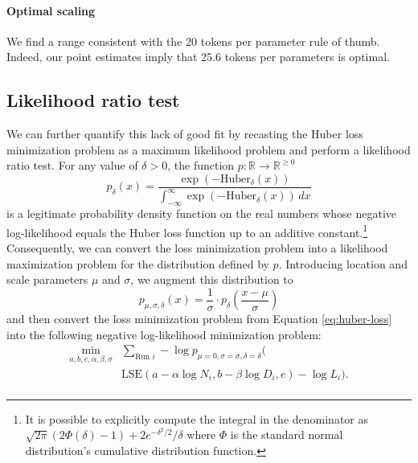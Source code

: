 \documentclass[twocolumn]{article}
\begin{document}
\paragraph{Optimal scaling} We find a range consistent with the 20 tokens per parameter rule of thumb. Indeed, our point estimates imply that 25.6 tokens per parameters is optimal.

\subsection{Likelihood ratio test}
\label{sec:likelihood_ratio}

We can further quantify this lack of good fit by recasting the Huber loss minimization problem as a maximum likelihood problem and perform a likelihood ratio test. For any value of \( \delta > 0 \), the function \( p: \mathbb R \to \mathbb R^{\geq 0} \)
\begin{equation}
    p_{\delta}(x) = \frac{\exp(-\text{Huber}_\delta(x))}{\int_{-\infty}^{\infty} \exp(-\text{Huber}_\delta(x)) \, dx}
\end{equation}
is a legitimate probability density function on the real numbers whose negative log-likelihood equals the Huber loss function up to an additive constant.\footnote{It is possible to explicitly compute the integral in the denominator as \( \sqrt{2 \pi} (2 \Phi(\delta) - 1) + 2 e^{-\delta^2/2}/\delta \) where $ \Phi $ is the standard normal distribution's cumulative distribution function.} Consequently, we can convert the loss minimization problem into a likelihood maximization problem for the distribution defined by \( p \). Introducing location and scale parameters \( \mu \) and \( \sigma \), we augment this distribution to
\begin{equation}
    p_{\mu, \sigma, \delta}(x) = \frac{1}{\sigma} \cdot p_{\delta} \left( \frac{x - \mu}{\sigma} \right)
\end{equation}
and then convert the loss minimization problem from Equation \ref{eq:huber-loss} into the following negative log-likelihood minimization problem:
\begin{equation}
\label{eq:huber-likelihood-problem}
\begin{split}
\min_{a,b,e,\alpha,\beta,\sigma} & \sum_{\text{Run } i} -\log p_{\mu=0, \sigma=\sigma, \delta=\delta} \bigg( \\
& \text{LSE}\left( a - \alpha \log N_i, b - \beta \log D_i, e \right) - \log L_i
\bigg). \\
\end{split}
\end{equation}
\end{document}
